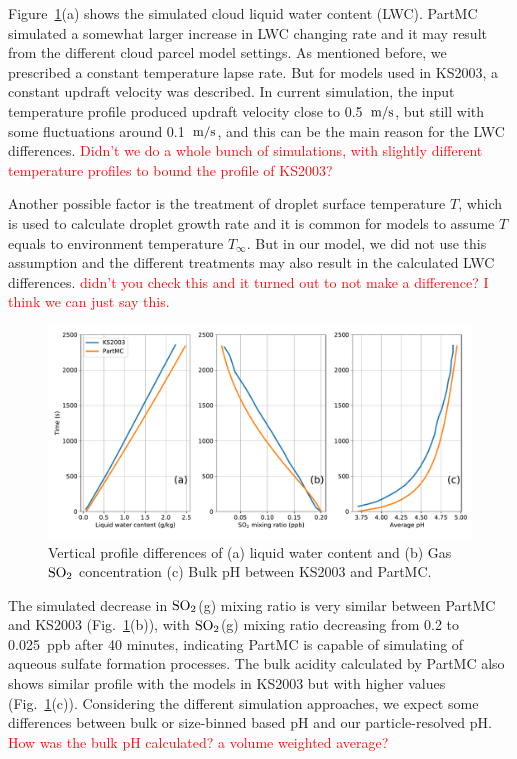 \documentclass[edeposit,fullpage]{uiucthesis2009}
\makeatletter
\DeclareRobustCommand*\unit[1]
 {\ensuremath{%
   {\thinmuskip3mu\relax
    \def\mu{\text{\textmu}}\def~{\,}%
    \ifx\f@series\testbx\mathbf{#1}\else\mathrm{#1}\fi}}}
\makeatother
\begin{document}
Figure~\ref{chap2:ks2003}(a) shows the simulated cloud liquid water
content (LWC). PartMC simulated a somewhat larger increase in LWC
changing rate and it may result from the different cloud parcel model
settings. As mentioned before, we prescribed a constant temperature
lapse rate. But for models used in KS2003, a constant updraft velocity
was described. In current simulation, the input temperature profile
produced updraft velocity close to 0.5~\unit{m/s}, but still with some
fluctuations around 0.1~\unit{m/s}, and this can be the main reason
for the LWC differences. \textcolor{red}{Didn't we do a whole bunch of
  simulations, with slightly different temperature profiles to bound
  the profile of KS2003?}

Another possible factor is the treatment of droplet surface
temperature $T$, which is used to calculate droplet growth rate and it
is common for models to assume $T$ equals to environment temperature
$T_\infty$. But in our model, we did not use this assumption and the
different treatments may also result in the calculated LWC
differences. \textcolor{red}{didn't you check this and it turned out
  to not make a difference? I think we can just say this.}

\begin{figure}[ht]
    \centering \includegraphics[scale=0.5]{chap2_figs/chap2_fig1_profile.pdf}
    \caption{Vertical profile differences of (a) liquid water content
      and (b) Gas $\rm SO_2$ concentration (c) Bulk pH between KS2003
      and PartMC.}
    \label{chap2:ks2003}
\end{figure}

The simulated decrease in $\rm SO_2$(g) mixing ratio is very similar
between PartMC and KS2003 (Fig.~\ref{chap2:ks2003}(b)), with $\rm
SO_2$(g) mixing ratio decreasing from 0.2 to 0.025~ppb after 40
minutes, indicating PartMC is capable of simulating of aqueous sulfate
formation processes. The bulk acidity calculated by PartMC also shows
similar profile with the models in KS2003 but with higher values
(Fig.~\ref{chap2:ks2003}(c)). Considering the different simulation
approaches, we expect some differences between bulk or size-binned
based pH and our particle-resolved pH. \textcolor{red}{How was the
  bulk pH calculated? a volume weighted average?}
\end{document}
